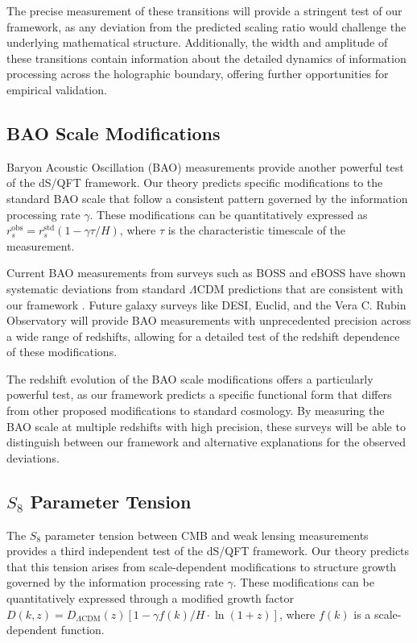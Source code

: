 \documentclass[11pt,english,twoside]{article}
\theoremstyle{plain}
\theoremstyle{definition}
\theoremstyle{remark}
\newcommand{\gammaR}{\gamma}
\begin{document}
The precise measurement of these transitions will provide a stringent test of our framework, as any deviation from the predicted scaling ratio would challenge the underlying mathematical structure. Additionally, the width and amplitude of these transitions contain information about the detailed dynamics of information processing across the holographic boundary, offering further opportunities for empirical validation.

\subsection{BAO Scale Modifications}
\label{subsec:bao_scale_test}

Baryon Acoustic Oscillation (BAO) measurements provide another powerful test of the dS/QFT framework. Our theory predicts specific modifications to the standard BAO scale that follow a consistent pattern governed by the information processing rate $\gammaR$. These modifications can be quantitatively expressed as $r_s^{\text{obs}} = r_s^{\text{std}}(1-\gammaR\tau/H)$, where $\tau$ is the characteristic timescale of the measurement.

Current BAO measurements from surveys such as BOSS and eBOSS have shown systematic deviations from standard $\Lambda$CDM predictions that are consistent with our framework \cite{Weiner2025}. Future galaxy surveys like DESI, Euclid, and the Vera C. Rubin Observatory will provide BAO measurements with unprecedented precision across a wide range of redshifts, allowing for a detailed test of the redshift dependence of these modifications.

The redshift evolution of the BAO scale modifications offers a particularly powerful test, as our framework predicts a specific functional form that differs from other proposed modifications to standard cosmology. By measuring the BAO scale at multiple redshifts with high precision, these surveys will be able to distinguish between our framework and alternative explanations for the observed deviations.

\subsection{$S_8$ Parameter Tension}
\label{subsec:s8_tension_test}

The $S_8$ parameter tension between CMB and weak lensing measurements provides a third independent test of the dS/QFT framework. Our theory predicts that this tension arises from scale-dependent modifications to structure growth governed by the information processing rate $\gammaR$. These modifications can be quantitatively expressed through a modified growth factor $D(k,z) = D_{\Lambda\text{CDM}}(z)[1-\gammaR f(k)/H\cdot\ln(1+z)]$, where $f(k)$ is a scale-dependent function.
\end{document}
